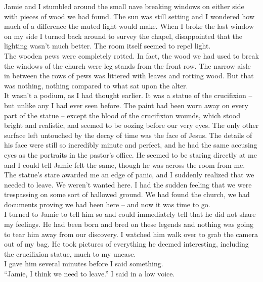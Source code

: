 \documentclass[a5paper]{scrartcl}
\begin{document}
Jamie and I stumbled around the small nave breaking windows on either side with pieces of wood we had found. The sun was still setting and I wondered how much of a difference the muted light would make. When I broke the last window on my side I turned back around to survey the chapel, disappointed that the lighting wasn't much better. The room itself seemed to repel light.\\


The wooden pews were completely rotted. In fact, the wood we had used to break the windows of the church were leg stands from the front row. The narrow aisle in between the rows of pews was littered with leaves and rotting wood. But that was nothing, nothing compared to what sat upon the alter. \\


It wasn't a podium, as I had thought earlier. It was a statue of the crucifixion – but unlike any I had ever seen before. The paint had been worn away on every part of the statue – except the blood of the crucifixion wounds, which stood bright and realistic, and seemed to be oozing before our very eyes. The only other surface left untouched by the decay of time was the face of Jesus. The details of his face were still so incredibly minute and perfect, and he had the same accusing eyes as the portraits in the pastor's office. He seemed to be staring directly at me and I could tell Jamie felt the same, though he was across the room from me. \\


The statue's stare awarded me an edge of panic, and I suddenly realized that we needed to leave. We weren't wanted here. I had the sudden feeling that we were trespassing on some sort of hallowed ground. We had found the church, we had documents proving we had been here – and now it was time to go. \\


I turned to Jamie to tell him so and could immediately tell that he did not share my feelings. He had been born and bred on these legends and nothing was going to tear him away from our discovery. I watched him walk over to grab the camera out of my bag. He took pictures of everything he deemed interesting, including the crucifixion statue, much to my unease. \\


I gave him several minutes before I said something.\\


\enquote{Jamie, I think we need to leave.} I said in a low voice.\\
\end{document}
